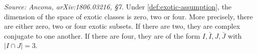 \begin{lemma}
  \label{lem:exotic-count}
  \textit{Source: Ancona, arXiv:1806.03216, §7.}
  Under \cref{def:exotic-assumption}, the dimension of the space of exotic
  classes is zero, two or four. More precisely, there are either zero, two or
  four exotic subsets. If there are two, they are complex conjugate to one
  another. If there are four, they are of the form \(I, \bar I, J, \bar J\) with
  \(|I \cap J| = 3\).
\end{lemma}

